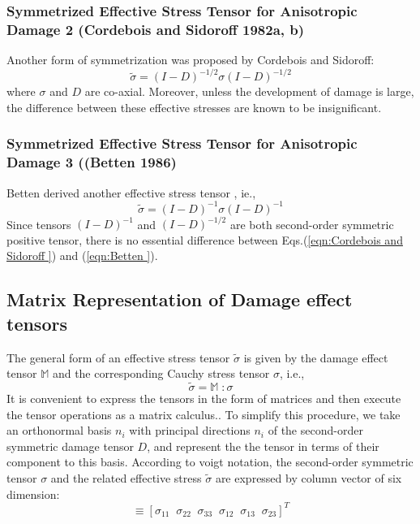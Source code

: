 \documentclass[a4paper,14pt]{extarticle}
\begin{document}
\subsubsection{Symmetrized Effective Stress Tensor for Anisotropic Damage 2 (Cordebois and Sidoroff 1982a, b)}
\indent\indent\indent Another form of symmetrization was proposed by Cordebois and Sidoroff:
\begin{equation}
\label{eqn:Cordebois and Sidoroff }
\tilde{\sigma} =  (I - D)^{-1/2}\sigma(I - D)^{-1/2}
\end{equation}
where $\sigma$ and $D$ are co-axial. Moreover, unless the development of damage is large, the difference between these effective stresses are known to be insignificant.\\
\subsubsection{Symmetrized Effective Stress Tensor for Anisotropic Damage 3 ((Betten 1986)}
\indent\indent\indent  Betten derived another effective stress tensor , ie.,
\begin{equation}
\label{eqn:Betten }
\tilde{\sigma} =  (I - D)^{-1}\sigma(I - D)^{-1}
\end{equation} 
Since tensors $(I - D)^{-1}$ and $(I - D)^{-1/2}$ are both second-order symmetric positive tensor, there is no essential difference between Eqs.(\ref{eqn:Cordebois and Sidoroff }) and (\ref{eqn:Betten }).

\subsection{Matrix Representation of Damage effect tensors}\label{Matrix Representation of Damage effect tensors}
\indent\indent\indent The general form of an effective stress tensor $\tilde{\sigma}$ is given by the damage effect tensor $\mathbb{M}$ and the corresponding Cauchy stress tensor $\sigma$, i.e.,
\begin{equation}
\tilde{\sigma}  = \mathbb{M} \; :  \sigma 
\label{eqn:effective_stress_tensor} 
\end{equation}
It is convenient to express the tensors in the form of matrices and then execute the tensor operations as a matrix calculus.. To simplify this procedure, we take an orthonormal basis ${n_{i}}$ with principal directions $n_{i}$ of the second-order symmetric damage tensor $D$, and represent the the tensor in terms of their component to this basis. According to voigt notation, the second-order symmetric tensor $\sigma$ and the related effective stress $\tilde{\sigma}$ are expressed by column vector of six dimension:
\begin{equation}
   [\sigma_{P}]  \equiv  [\sigma_{11} \;\; \sigma_{22} \;\;\sigma_{33} \;\;\sigma_{12} \;\;\sigma_{13} \;\;\sigma_{23} ]^{T}
\end{equation}
\end{document}

